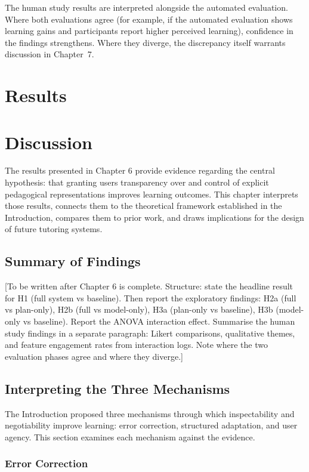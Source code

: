 \documentclass[logo,bsc,singlespacing,parskip,online]{infthesis}
\begin{document}
The human study results are interpreted alongside the automated evaluation. Where both evaluations agree (for example, if the automated evaluation shows learning gains and participants report higher perceived learning), confidence in the findings strengthens. Where they diverge, the discrepancy itself warrants discussion in Chapter~7.


\chapter{Results}

\chapter{Discussion}

The results presented in Chapter 6 provide evidence regarding the central hypothesis: that granting users transparency over and control of explicit pedagogical representations improves learning outcomes. This chapter interprets those results, connects them to the theoretical framework established in the Introduction, compares them to prior work, and draws implications for the design of future tutoring systems.

\section{Summary of Findings}

[To be written after Chapter 6 is complete. Structure: state the headline result for H1 (full system vs baseline). Then report the exploratory findings: H2a (full vs plan-only), H2b (full vs model-only), H3a (plan-only vs baseline), H3b (model-only vs baseline). Report the ANOVA interaction effect. Summarise the human study findings in a separate paragraph: Likert comparisons, qualitative themes, and feature engagement rates from interaction logs. Note where the two evaluation phases agree and where they diverge.]

\section{Interpreting the Three Mechanisms}

The Introduction proposed three mechanisms through which inspectability and negotiability improve learning: error correction, structured adaptation, and user agency. This section examines each mechanism against the evidence.

\subsection{Error Correction}
\end{document}

